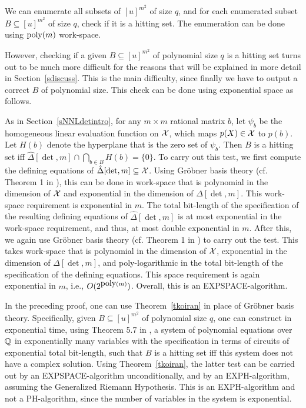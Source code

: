 \documentclass[11pt]{article}
\begin{document}
We can enumerate  all subsets of $[u]^{m^2}$ of size $q$, and for each enumerated subset 
$B \subseteq [u]^{m^2}$ of size $q$,  check if it is a hitting set. The enumeration  can be done using  ${\mbox {poly}}(m)$ work-space. 

However, checking if a given $B \subseteq [u]^{m^2}$ of polynomial size $q$ 
is a hitting set turns out to be much more difficult for the reasons
that will be explained in more detail  in Section~\ref{sdiscuss}.
This is the main difficulty, since finally we have to output a correct 
$B$ of polynomial size. This check can be done using exponential space as follows.

As in Section~\ref{sNNLdetintro}, for any $m \times m$ rational matrix $b$, let 
$\psi_b$ be the 
homogeneous linear evaluation function  on ${\cal X}$, which maps $p(X) \in {\cal X}$ to $p(b)$.
Let $H(b)$ denote the hyperplane that is the zero set 
of $\psi_{b}$. Then $B$ is a hitting set iff $\hat \Delta[\det,m] \cap \bigcap_{b \in B}
H(b) = \{0\}$. To carry out this test, we first compute 
the defining 
equations of $\hat \Delta[\det,m] \subseteq {\cal X}$. Using Gr\"obner basis theory (cf. Theorem 1  in \cite{mayr2}), this 
can be done in work-space that is polynomial in the dimension of ${\cal X}$ and exponential in the dimension of $\Delta[\det,m]$. 
This  work-space requirement is exponential in $m$. The total bit-length of the specification of the 
resulting defining equations of $\hat \Delta[\det,m]$ is at most exponential in the work-space requirement,
and thus, at most double exponential in $m$.
After this, we again use Gr\"obner basis theory (cf. Theorem 1 in \cite{mayr2})
to carry out the test. This  takes work-space that is polynomial in the dimension of ${\cal X}$, 
exponential in the dimension of $\Delta[\det,m]$, and poly-logarithmic in
the total bit-length of the specification of the defining equations.
This space requirement is again exponential in $m$, i.e., $O(2^{{\mbox {poly}}(m)})$.
Overall, this is an EXPSPACE-algorithm. 

In the preceding proof, one can use Theorem~\ref{tkoiran} in place of Gr\"obner basis theory.
Specifically, given  $B \subseteq [u]^{m^2}$ of polynomial size $q$, 
one can construct in exponential time,
using Theorem 5.7 in \cite{burg2}, a system of polynomial equations over $\mathbb{Q}$ in exponentially many variables
with the  specification in terms of circuits  of  exponential total bit-length, such that 
$B$ is a hitting set iff this system does not have a complex solution. 
Using Theorem~\ref{tkoiran}, the latter test can be carried out by an EXPSPACE-algorithm
unconditionally, and by an EXPH-algorithm, assuming  the Generalized Riemann Hypothesis.
This is an EXPH-algorithm and not a PH-algorithm, since the number of variables in the system
is exponential.
\end{document}
